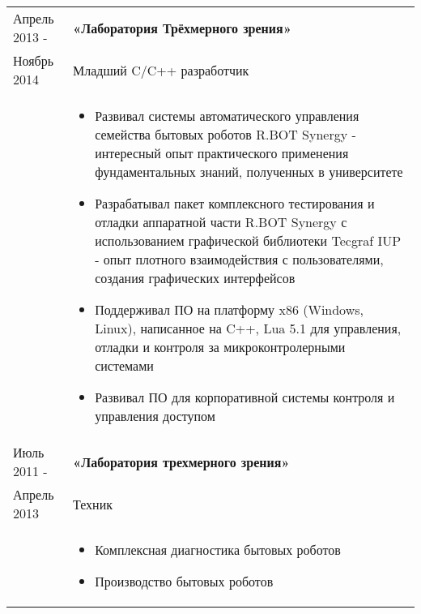 \documentclass[a4paper, 11pt]{article}
\begin{document}
\begin{longtable}{p{25mm}|p{110mm}}
    \pagebreak[4]
    Апрель 2013 -       & \textbf{«Лаборатория Трёхмерного зрения»}                 \\
    Ноябрь 2014         & Младший C/C++ разработчик                                 \\
                        &
    \begin{itemize}
        \item   Развивал системы автоматического управления семейства бытовых
                роботов R.BOT Synergy - интересный опыт практического применения
                фундаментальных знаний, полученных в университете
        \item   Разрабатывал пакет комплексного тестирования и отладки аппаратной
                части R.BOT Synergy с использованием графической библиотеки
                Tecgraf IUP - опыт плотного взаимодействия с пользователями,
                создания графических интерфейсов
        \item   Поддерживал ПО на платформу x86 (Windows, Linux), написанное на
                C++, Lua 5.1 для управления, отладки и контроля за
                микроконтролерными системами
        \item   Развивал ПО для корпоративной системы контроля и управления
                доступом
    \end{itemize}                                                                   \\

    \pagebreak[3]
    Июль 2011 - & \textbf{«Лаборатория трехмерного зрения»}                         \\
    Апрель 2013 & Техник                                                            \\
                &
    \begin{itemize}
        \item   Комплексная диагностика бытовых роботов
        \item   Производство бытовых роботов
    \end{itemize}                                                                   \\
\end{longtable}
\end{document}
